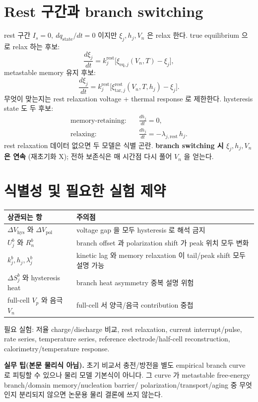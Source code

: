 \documentclass[11pt,a4paper]{article}
\newcommand{\eq}{\mathrm{eq}}
\newcommand{\rst}{\mathrm{rest}}
\newcommand{\hys}{\mathrm{hys}}
\newcommand{\pol}{\mathrm{pol}}
\newcommand{\tar}{\mathrm{tar}}
\newcommand{\stt}{\mathrm{state}}
\begin{document}
\section{Rest 구간과 branch switching}\label{sec:ch5_rest}
rest 구간 $I_s=0,\ dq_\stt/dt=0$ 이지만 $\xi_j,h_j,V_n$ 은 relax 한다. true equilibrium 으로 relax 하는 후보:
\begin{equation}
\frac{d\xi_j}{dt}=k_j^\rst\big[\xi_{\eq,j}(V_n,T)-\xi_j\big],
\label{eq:ch5_rest_eq}
\end{equation}
metastable memory 유지 후보:
\begin{equation}
\frac{d\xi_j}{dt}=k_j^\rst\big[\xi_{\tar,j}^\rst(V_n,T,h_j)-\xi_j\big].
\label{eq:ch5_rest_meta}
\end{equation}
무엇이 맞는지는 rest relaxation voltage + thermal response 로 제한한다. hysteresis state 도 두 후보:
\begin{align}
\text{memory-retaining:}\quad &\frac{dh_j}{dt}=0,\label{eq:ch5_h_rest_mem}\\
\text{relaxing:}\quad &\frac{dh_j}{dt}=-\lambda_{j,\rst}\,h_j.\label{eq:ch5_h_rest_relax}
\end{align}
rest relaxation 데이터 없으면 두 모델은 식별 곤란. \textbf{branch switching 시 $\xi_j,h_j,V_n$ 은 연속}
(재초기화 X); 전하 보존식은 매 시간점 다시 풀어 $V_n$ 을 얻는다.

\section{식별성 및 필요한 실험 제약}\label{sec:ch5_ident}
\begin{longtable}{p{} p{}}
\toprule 상관되는 항 & 주의점 \\ \midrule \endhead
$\Delta V_\hys$ 와 $\Delta V_\pol$ & voltage gap 을 모두 hysteresis 로 해석 금지 \\
$U_j^b$ 와 $R_n^b$ & branch offset 과 polarization shift 가 peak 위치 모두 변화 \\
$k_j^b,h_j,\lambda_j^b$ & kinetic lag 와 memory relaxation 이 tail/peak shift 모두 설명 가능 \\
$\Delta S_j^b$ 와 hysteresis heat & branch heat asymmetry 중복 설명 위험 \\
full-cell $V_p$ 와 음극 $V_n$ & full-cell 서 양극/음극 contribution 중첩 \\
\bottomrule
\end{longtable}
필요 실험: 저율 charge/discharge 비교, rest relaxation, current interrupt/pulse, rate series, temperature
series, reference electrode/half-cell reconstruction, calorimetry/temperature response.
\begin{mdframed}
\textbf{실무 팁(본문 물리식 아님).} 초기 비교서 충전/방전을 별도 empirical branch curve 로 피팅할 수 있으나
물리 모델 기본식이 아니다. 그 curve 가 metastable free-energy branch/domain memory/nucleation barrier/
polarization/transport/aging 중 무엇인지 분리되지 않으면 논문용 물리 결론에 쓰지 않는다.
\end{mdframed}
\end{document}
